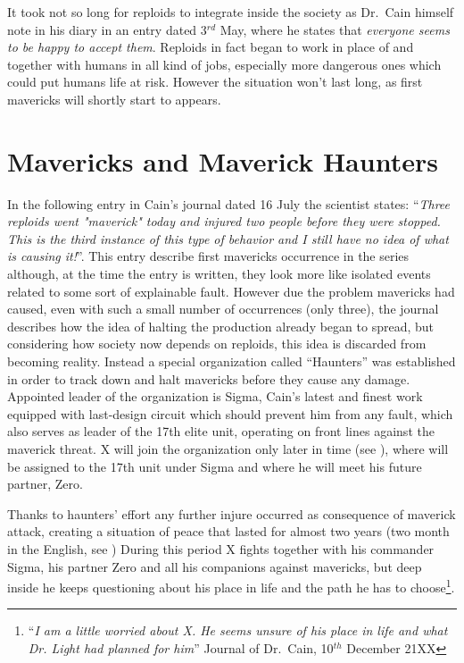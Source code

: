 It took not so long for reploids to integrate inside the society as Dr.~Cain himself note in his diary in an entry dated 3$^{rd}$ May, where he states that \textit{everyone seems to be happy to accept them}. Reploids in fact began to work in place of and together with humans in all kind of jobs, especially more dangerous ones which could put humans life at risk. However the situation won't last long,  as first mavericks will shortly start to appears.

\section{Mavericks and Maverick Haunters}

In the following entry in Cain's journal dated 16 July the scientist states: ``\textit{Three reploids went "maverick" today and injured two people before they were stopped. This is the third instance of this type of behavior and I still have no idea of what is causing it!}''. This entry describe first mavericks occurrence in the series although, at the time the entry is written, they look more like isolated events related to some sort of explainable fault. However due the problem mavericks had caused, even with such a small number of occurrences (only three), the journal describes how the idea of halting the production already began to spread, but considering how society now depends on reploids, this idea is discarded from becoming reality. Instead a special organization called ``Haunters'' was established in order to track down and halt mavericks before they cause any damage. Appointed leader of the organization is Sigma, Cain's latest and finest work equipped with last-design circuit which should prevent him from any fault, which also serves as leader of the 17th elite unit, operating on front lines against the maverick threat. X will join the organization only later in time (see \PtIIWarning), where will be assigned to the 17th unit under Sigma and where he will meet his future partner, Zero. 

Thanks to haunters' effort any further injure occurred as consequence of maverick attack, creating a situation of peace that lasted  for almost two years (two month in the English, see \PtIIWarning) During this period X fights together with his commander Sigma, his partner Zero and all his companions against mavericks, but deep inside he keeps questioning about his place in life and the path he has to choose\footnote{``\textit{I am a little worried about X. He seems unsure of his place in life and what Dr. Light had planned for him}'' Journal of Dr.~Cain, 10$^{th}$ December 21XX}.

